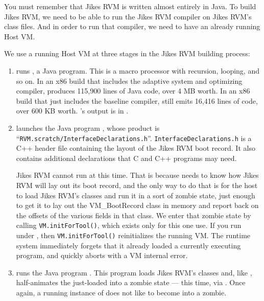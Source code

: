 You must remember that Jikes RVM is written almost entirely in Java.
To build Jikes RVM, we need to be able to run the Jikes RVM compiler
on Jikes RVM's class files.  And in order to run that compiler, we
need to have an already running Host VM.

We use a running Host VM at three stages in the Jikes RVM
building process:

\begin{enumerate}

%
\item {} runs
	\gft{}, a Java program.
This is a macro processor
with recursion, looping,
and so on.   In an x86 \jrvm{} build that includes the adaptive system and
optimizing compiler, \gft{} produces 115,900 lines of Java code, over
4 MB worth.    In an x86 \jrvm{} build that just includes the baseline
compiler, \gft{} still emits 16,416 lines of code, over 600 KB
worth.    \gft's output is in .


\item {} 
launches the Java program \gid{}, whose product is
``\texttt{RVM.scratch/InterfaceDeclarations.h}''.
\texttt{InterfaceDeclarations.h} is a C++ header file containing the layout of
the Jikes RVM boot record.  It also contains additional declarations
that C and C++ programs may need.

Jikes RVM cannot run \gid{} at this time.  That is because \gid{}
needs to know how Jikes RVM will lay out its boot record, and the only
way to do that is for the host to load Jikes RVM's classes and run it
in a sort of zombie state, just enough to get it to lay out the
VM\_BootRecord class in memory and report back on the offsets of the
various fields in that class.  We enter that zombie state by calling
\texttt{VM.initForTool()}, which exists only for this one use. 
 If you run \gid{} under \jrvm{},
then \texttt{VM.initForTool()} reinitializes the running VM.  The
runtime system immediately forgets that it already loaded a currently
executing program, and quickly aborts with a VM internal error.


\item {} runs the Java program
.  This program loads Jikes RVM's classes
and, like \gid, half-animates the just-loaded \jrvm{} into a zombie
state --- this time, via .  Once
again, a running instance of \jrvm{} does not like to become into a
zombie.

\end{enumerate}

